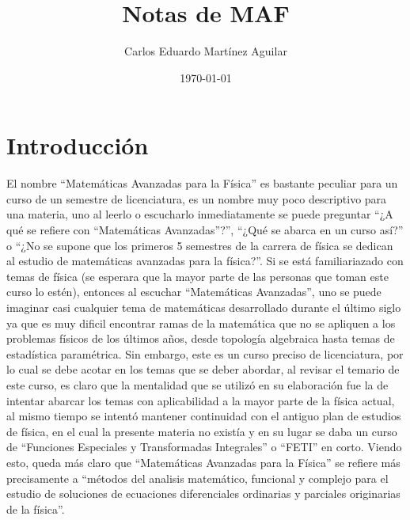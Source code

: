 \documentclass[letterpaper]{book}
\author{Carlos Eduardo Martínez Aguilar}
\date{\today}
\title{Notas de MAF}
\begin{document}
\maketitle
\tableofcontents

\chapter{Introducción}

\noindent El nombre ``Matemáticas Avanzadas para la Física'' es bastante peculiar para un curso de un semestre de licenciatura, es un nombre muy poco descriptivo para una materia, uno al leerlo o escucharlo inmediatamente se puede preguntar ``¿A qué se refiere con ``Matemáticas Avanzadas''?'', ``¿Qué se abarca en un curso así?'' o ``¿No se supone que los primeros 5 semestres de la carrera de física se dedican al estudio de matemáticas avanzadas para la física?''. Si se está familiariazado con temas de física (se esperara que la mayor parte de las personas que toman este curso lo estén), entonces al escuchar ``Matemáticas Avanzadas'', uno se puede imaginar casi cualquier tema de matemáticas desarrollado durante el último siglo ya que es muy dificil encontrar ramas de la matemática que no se apliquen a los problemas físicos de los últimos años, desde topología algebraica hasta temas de estadística paramétrica.
Sin embargo, este es un curso preciso de licenciatura, por lo cual se debe acotar en los temas que se deber abordar, al revisar el temario de este curso, es claro que la mentalidad que se utilizó en su elaboración fue la de intentar abarcar los temas con aplicabilidad a la mayor parte de la física actual, al mismo tiempo se intentó mantener continuidad con el antiguo plan de estudios de física, en el cual la presente materia no existía y en su lugar se daba un curso de ``Funciones Especiales y Transformadas Integrales'' o ``FETI'' en corto. Viendo esto, queda más claro que ``Matemáticas Avanzadas para la Física'' se refiere más precisamente a ``métodos del analisis matemático, funcional y complejo para el estudio de soluciones de ecuaciones diferenciales ordinarias y parciales originarias de la física''.
\end{document}

